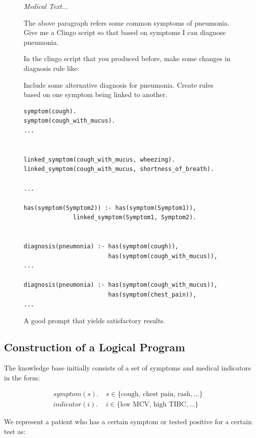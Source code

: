 \documentclass[10pt,leqno]{amsart}
\newenvironment{commandline}{
	\medskip
	\begin{mdframed}[style=commandline]
}{
	\end{mdframed}
	\medskip
}
\newenvironment{prompt}[1][Prompt:]{ %
	\medskip
	\begin{mdframed}[style=warning]
		\noindent{\textbf{#1}}
}{
	\end{mdframed}
}
\begin{document}
\begin{figure}[!h]
\begin{prompt}
\textit{Medical Text...}

The above paragraph refers some common symptoms of pneumonia.
Give me a Clingo script so that based on symptoms I can diagnose pneumonia.

In the clingo script that you produced before, make some changes in diagnosis rule like:

Include some alternative diagnosis for pneumonia.
Create rules based on one symptom being linked to another.
\end{prompt}


\begin{commandline}
\scriptsize
\begin{verbatim}
symptom(cough).
symptom(cough_with_mucus).
...


linked_symptom(cough_with_mucus, wheezing).
linked_symptom(cough_with_mucus, shortness_of_breath).

...

has(symptom(Symptom2)) :- has(symptom(Symptom1)), 
              linked_symptom(Symptom1, Symptom2).


diagnosis(pneumonia) :- has(symptom(cough)),
                        has(symptom(cough_with_mucus)),
...

diagnosis(pneumonia) :- has(symptom(cough_with_mucus)),
                        has(symptom(chest_pain)),
...
\end{verbatim}
\end{commandline}
\caption{A good prompt that yields satisfactory results.}
\label{fig:good-prompt}
\end{figure}

\subsection{Construction of a Logical Program}

The knowledge base initially consists of a set of symptoms and medical indicators in the form:

\begin{align}
    symptom(s). & \; s \in \{ \text{cough, chest pain, rash}, \dots \} \\
    indicator(i). & \; i \in \{ \text{low MCV, high TIBC}, \dots \}
\end{align}

We represent a patient who has a certain symptom or tested positive for a certain test as:
\end{document}
